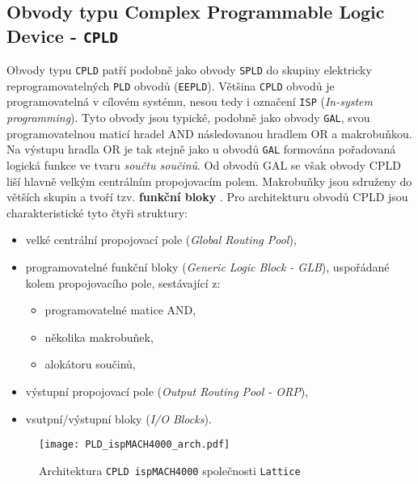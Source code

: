   \newpage
  \subsection{Obvody typu Complex Programmable Logic Device - \texttt{CPLD}} 
    Obvody typu \texttt{CPLD} patří podobně jako obvody \texttt{SPLD} do skupiny elektricky
    reprogramovatelných \texttt{PLD} obvodů (\texttt{EEPLD}). Většina \texttt{CPLD} obvodů je
    programovatelná v cílovém systému, nesou tedy i označení \texttt{ISP} (\emph{In-system
    programming}). Tyto obvody jsou typické, podobně jako obvody \texttt{GAL}, svou
    programovatelnou maticí hradel AND následovanou hradlem OR a makrobuňkou. Na výstupu hradla OR
    je tak stejně jako u obvodů \texttt{GAL} formována pořadovaná logická funkce ve tvaru
    \emph{součtu součinů}. Od obvodů GAL se však obvody CPLD liší hlavně velkým centrálním
    propojovacím polem. Makrobuňky jsou sdruženy do větších skupin a tvoří tzv. \textbf{funkční
    bloky} \cite[p~279]{Pinker2006}. Pro architekturu obvodů CPLD jsou charakteristické tyto čtyři
    struktury:
    \begin{itemize}
      \item velké centrální propojovací pole (\emph{Global Routing Pool}),
      \item programovatelné funkční bloky  (\emph{Generic Logic Block - GLB}), uspořádané ko\-lem
            propojovacího pole, sestávající z:
        \begin{itemize}
          \item programovatelné matice AND,
          \item několika makrobuňek,
          \item alokátoru součinů,          
        \end{itemize}
      \item výstupní propojovací pole (\emph{Output Routing Pool - ORP}),
      \item vsutpní/výstupní bloky  (\emph{I/O Blocks}).  
    \end{itemize}

        \begin{figure}[hb!]
          \centering
          \texttt{[image: PLD\_ispMACH4000\_arch.pdf]}
          \caption[Struktura obvodu CPLD]{Architektura \texttt{CPLD ispMACH4000} společnosti
                                          \texttt{Lattice}}
          \label{PLO:fig_arch_ispMACH4000}
        \end{figure}  
            
